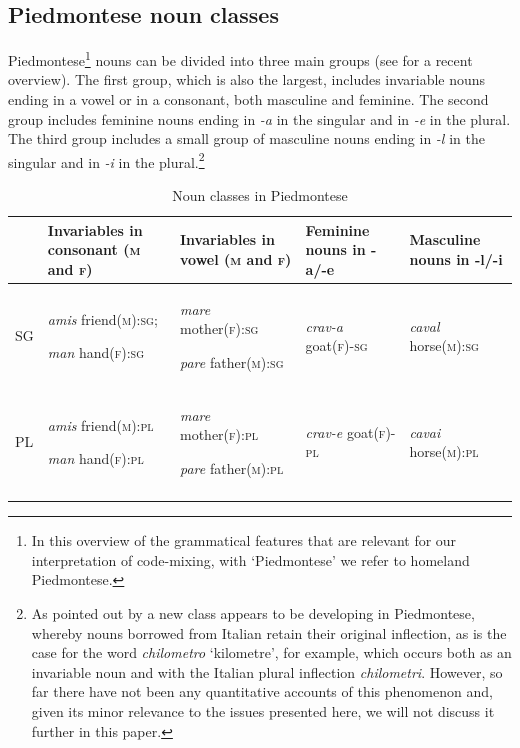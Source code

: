 \documentclass[output=paper]{langscibook}
\begin{document}
\subsection{Piedmontese noun classes}\label{sec:goria:4.2}

Piedmontese\footnote{In this overview of the grammatical features that are relevant for our interpretation of code-mixing, with ‘Piedmontese’ we refer to homeland Piedmontese.} nouns can be divided into three main groups (see \citealt{RegisRivoirainpress} for a recent overview). The first group, which is also the largest, includes invariable nouns ending in a vowel or in a consonant, both masculine and feminine. The second group includes feminine nouns ending in \textit{{}-a} in the singular and in \textit{{}-e} in the plural. The third group includes a small group of masculine nouns ending in \textit{{}-l} in the singular and in \textit{{}-i} in the plural.\footnote{As pointed out by \citet{Ricca2008} a new class appears to be developing in Piedmontese, whereby nouns borrowed from Italian retain their original inflection, as is the case for the word \textit{chilometro} ‘kilometre’, for example, which occurs both as an invariable noun and with the Italian plural inflection \textit{chilometri}. However, so far there have not been any quantitative accounts of this phenomenon and, given its minor relevance to the issues presented here, we will not discuss it further in this paper.}

\begin{table}
\begin{tabularx}{\textwidth}{lQQQQ}
\lsptoprule
 & { Invariables in consonant (\textsc{m} and \textsc{f}}) & Invariables in vowel (\textsc{m} and \textsc{f}) & Feminine nouns in -a/-e & Masculine nouns in -l/-i\\
\midrule
SG & \textit{amis} friend(\textsc{m}):\textsc{sg}; 

\textit{man} hand\textsc{(f):sg}  & \textit{mare} mother(\textsc{f):sg}

\textit{pare} father(\textsc{m}):\textsc{sg} & \textit{crav-a} goat(\textsc{f})-\textsc{sg}  & \textit{caval} horse(\textsc{m):sg} \\
\tablevspace
PL & \textit{amis} friend(\textsc{m):pl} 

\textit{man} hand(\textsc{f):pl} & \textit{mare} mother(\textsc{f}):\textsc{pl}

\textit{pare} father(\textsc{m}):\textsc{pl}  & \textit{crav-e} goat(\textsc{f})-\textsc{pl} & \textit{cavai} horse(\textsc{m}):\textsc{pl} \\
\lspbottomrule
\end{tabularx}
\caption{Noun classes in Piedmontese}
\label{tab:goria:3}
\end{table}
\end{document}
